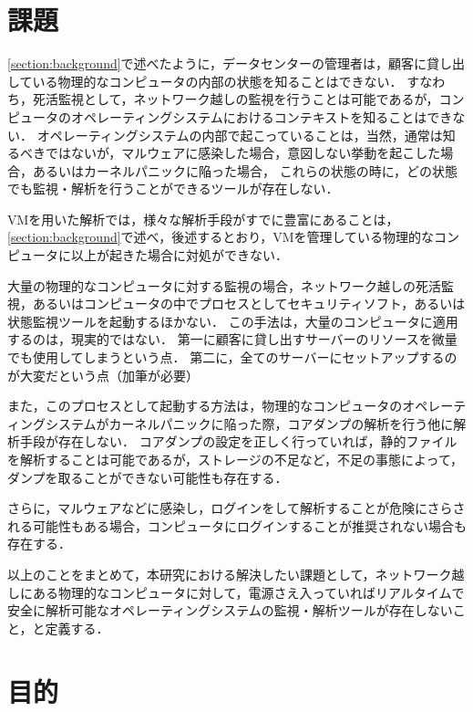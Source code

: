 \section{課題}
\label{section:problem}

\ref{section:background}で述べたように，データセンターの管理者は，顧客に貸し出している物理的なコンピュータの内部の状態を知ることはできない．
すなわち，死活監視として，ネットワーク越しの監視を行うことは可能であるが，コンピュータのオペレーティングシステムにおけるコンテキストを知ることはできない．
オペレーティングシステムの内部で起こっていることは，当然，通常は知るべきではないが，マルウェアに感染した場合，意図しない挙動を起こした場合，あるいはカーネルパニックに陥った場合，
これらの状態の時に，どの状態でも監視・解析を行うことができるツールが存在しない．

VMを用いた解析では，様々な解析手段がすでに豊富にあることは，\ref{section:background}で述べ，後述するとおり，VMを管理している物理的なコンピュータに以上が起きた場合に対処ができない．

大量の物理的なコンピュータに対する監視の場合，ネットワーク越しの死活監視，あるいはコンピュータの中でプロセスとしてセキュリティソフト，あるいは状態監視ツールを起動するほかない．
この手法は，大量のコンピュータに適用するのは，現実的ではない．
第一に顧客に貸し出すサーバーのリソースを微量でも使用してしまうという点．
第二に，全てのサーバーにセットアップするのが大変だという点（加筆が必要）

また，このプロセスとして起動する方法は，物理的なコンピュータのオペレーティングシステムがカーネルパニックに陥った際，コアダンプの解析を行う他に解析手段が存在しない．
コアダンプの設定を正しく行っていれば，静的ファイルを解析することは可能であるが，ストレージの不足など，不足の事態によって，ダンプを取ることができない可能性も存在する．

さらに，マルウェアなどに感染し，ログインをして解析することが危険にさらされる可能性もある場合，コンピュータにログインすることが推奨されない場合も存在する．

以上のことをまとめて，本研究における解決したい課題として，ネットワーク越しにある物理的なコンピュータに対して，電源さえ入っていればリアルタイムで安全に解析可能なオペレーティングシステムの監視・解析ツールが存在しないこと，と定義する．



\section{目的}
\label{section:purpose}

